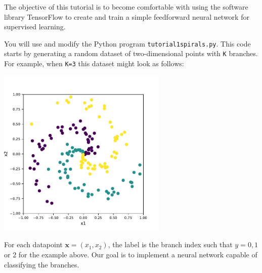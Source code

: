 \documentclass[letterpaper]{scrartcl}
\begin{document}

\vspace{-3cm}


\date{May 28, 2019}

\maketitle

The objective of this tutorial is to become comfortable with using the software library TensorFlow to 
create and train a simple feedforward neural network for supervised learning.

You will use and modify the Python program \texttt{tutorial1{\textunderscore}spirals.py}.
This code starts by generating a random dataset of two-dimensional points with \texttt{K} branches.
For example, when \texttt{K=3} this dataset might look as follows:
\vspace{-3mm}
\begin{center}
\includegraphics[width=8.1cm]{spiral_data.pdf}
\end{center}
For each datapoint $\mathbf{x} = (x_1, x_2)$, the label is the branch index such that $y = 0, 1$ or 2 for the example above.
Our goal is to implement a neural network capable of classifying the branches.
\end{document}
